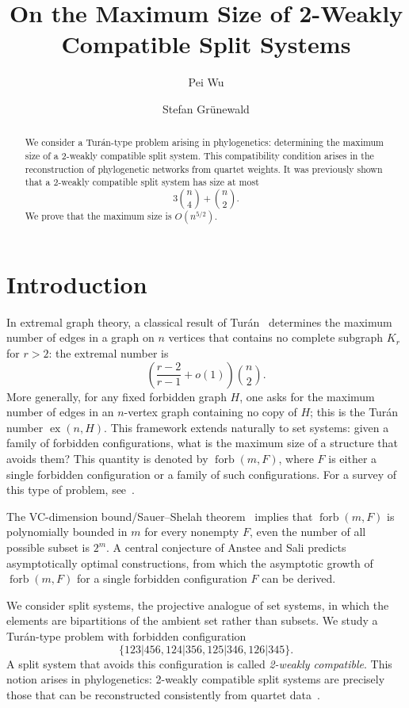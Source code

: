 \documentclass[11pt]{article}
\title{On the Maximum Size of 2-Weakly Compatible Split Systems}
\author{Pei Wu \and Stefan Gr\"unewald}
\date{}
\begin{document}
	\maketitle
	
	\begin{abstract}
		We consider a Tur\'an-type problem arising in phylogenetics: determining the maximum size of a 2-weakly compatible split system. This compatibility condition arises in the reconstruction of phylogenetic networks from quartet weights. It was previously shown that a 2-weakly compatible split system has size at most
		\[
		3\binom{n}{4}+\binom{n}{2}.
		\]
		We prove that the maximum size is $O(n^{5/2})$.
	\end{abstract}
	
	\section{Introduction}
	
	In extremal graph theory, a classical result of Tur\'an~\cite{Turan1941} determines the maximum number of edges in a graph on $n$ vertices that contains no complete subgraph $K_r$ for $r>2$: the extremal number is
	\[
	\left(\frac{r-2}{r-1}+o(1)\right)\binom{n}{2}.
	\]
	More generally, for any fixed forbidden graph $H$, one asks for the maximum number of edges in an $n$-vertex graph containing no copy of $H$; this is the Tur\'an number $\operatorname{ex}(n,H)$. This framework extends naturally to set systems: given a family of forbidden configurations, what is the maximum size of a structure that avoids them? This quantity is denoted by $\operatorname{forb}(m,F)$, where $F$ is either a single forbidden configuration or a family of such configurations. For a survey of this type of problem, see~\cite{AnsteeSali2013}. 
	
	The VC-dimension bound/Sauer--Shelah theorem~\cite{Sauer1972,Shelah1972,VapnikChervonenkis1971} implies that $\operatorname{forb}(m,F)$ is polynomially bounded in $m$ for every nonempty $F$, even the number of all possible subset is $2^m$. 
	A central conjecture of Anstee and Sali predicts asymptotically optimal constructions, from which the asymptotic growth of $\operatorname{forb}(m,F)$ for a single forbidden configuration $F$ can be derived.
	
	
	
	We consider split systems, the projective analogue of set systems, in which the elements are bipartitions of the ambient set rather than subsets. We study a Tur\'an-type problem with forbidden configuration
	\[
	\{123|456,124|356,125|346,126|345\}.
	\]
	A split system that avoids this configuration is called \emph{2-weakly compatible}. This notion arises in phylogenetics: 2-weakly compatible split systems are precisely those that can be reconstructed consistently from quartet data~\cite{YangGrunewaldWan2013}.
	
\end{document}
